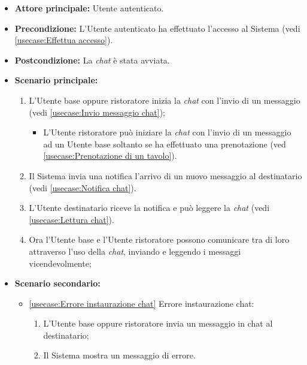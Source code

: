 \label{usecase:Chat Utente ristoratore}
\begin{itemize}
	\item \textbf{Attore principale:} Utente autenticato.

	\item \textbf{Precondizione:} L'Utente autenticato ha effettuato l'accesso al Sistema (vedi \autoref{usecase:Effettua accesso}).

	\item \textbf{Postcondizione:} La \textit{chat} è stata avviata.

	\item \textbf{Scenario principale:}
            \begin{enumerate}
				\item L'Utente base oppure ristoratore inizia la \textit{chat} con l'invio di un messaggio (vedi \autoref{usecase:Invio messaggio chat});
                \begin{itemize}
					\item L'Utente ristoratore può iniziare la \textit{chat} con l'invio di un messaggio ad un Utente base soltanto se ha effettuato una prenotazione (ved \autoref{usecase:Prenotazione di un tavolo}).
				\end{itemize}
                \item Il Sistema invia una notifica l'arrivo di un nuovo messaggio al destinatario (vedi \autoref{usecase:Notifica chat}).
                \item L'Utente destinatario riceve la notifica e può leggere la \textit{chat} (vedi \autoref{usecase:Lettura chat}).
                \item Ora l'Utente base e l'Utente ristoratore possono comunicare tra di loro attraverso l'uso della \textit{chat}, inviando e leggendo i messaggi vicendevolmente;
	      \end{enumerate}

    \item \textbf{Scenario secondario:}
		  \begin{itemize}
			  \item \autoref{usecase:Errore instaurazione chat} Errore instaurazione chat:
				\begin{enumerate}
					\item L'Utente base oppure ristoratore invia un messaggio in chat al destinatario;
					\item Il Sistema mostra un messaggio di errore.
				\end{enumerate}
		  \end{itemize}
\end{itemize}